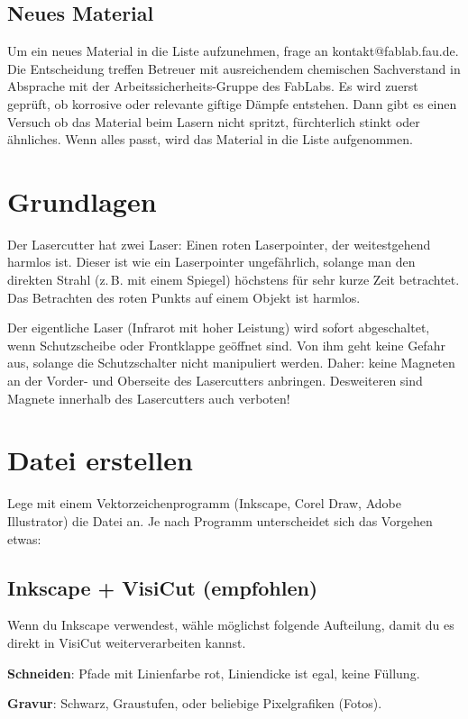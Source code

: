 \documentclass{\basedir/fablab-document}
\begin{document}
	\subsection{Neues Material}
	Um ein neues Material in die Liste aufzunehmen, frage an kontakt@fablab.fau.de. Die Entscheidung treffen Betreuer mit ausreichendem chemischen Sachverstand in Absprache mit der Arbeitssicherheits-Gruppe des FabLabs. Es wird zuerst geprüft, ob korrosive oder relevante giftige Dämpfe entstehen. Dann gibt es einen Versuch ob das Material beim Lasern nicht spritzt, fürchterlich stinkt oder ähnliches. Wenn alles passt, wird das Material in die Liste aufgenommen.

	\section{Grundlagen}
	Der Lasercutter hat zwei Laser: Einen roten Laserpointer, der weitestgehend harmlos ist. Dieser ist wie ein Laserpointer ungefährlich, solange man den direkten Strahl (z.\,B. mit einem Spiegel) höchstens für sehr kurze Zeit betrachtet. Das Betrachten des roten Punkts auf einem Objekt ist harmlos.

	Der eigentliche Laser (Infrarot mit hoher Leistung) wird sofort abgeschaltet, wenn Schutzscheibe oder Frontklappe geöffnet sind. Von ihm geht keine Gefahr aus, solange die Schutzschalter nicht manipuliert werden. Daher: keine Magneten an der Vorder- und Oberseite des Lasercutters anbringen. Desweiteren sind Magnete innerhalb des Lasercutters auch verboten!

	\section{Datei erstellen}
	Lege mit einem Vektorzeichenprogramm (Inkscape, Corel Draw, Adobe Illustrator) die Datei an. Je nach Programm unterscheidet sich das Vorgehen etwas:

	\subsection{Inkscape + VisiCut (empfohlen)}
	Wenn du Inkscape verwendest, wähle möglichst folgende Aufteilung, damit du es direkt in VisiCut weiterverarbeiten kannst.

	\textbf{Schneiden}: Pfade mit Linienfarbe rot, Liniendicke ist egal, keine Füllung.

	\textbf{Gravur}: Schwarz, Graustufen, oder beliebige Pixelgrafiken (Fotos).
\end{document}
